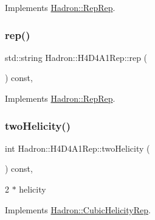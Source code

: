 Implements \mbox{\hyperlink{structHadron_1_1RepRep_ab3213025f6de249f7095892109575fde}{Hadron\+::\+Rep\+Rep}}.

\mbox{\label{structHadron_1_1H4D4A1Rep_a5b67fac5b33edc0fa72a93420b2714ca}} 
\subsubsection{\texorpdfstring{rep()}{rep()}\hspace{0.1cm}{\footnotesize\ttfamily [5/5]}}
{\footnotesize\ttfamily std\+::string Hadron\+::\+H4\+D4\+A1\+Rep\+::rep (\begin{DoxyParamCaption}{ }\end{DoxyParamCaption}) const\hspace{0.3cm}{\ttfamily [inline]}, {\ttfamily [virtual]}}



Implements \mbox{\hyperlink{structHadron_1_1RepRep_ab3213025f6de249f7095892109575fde}{Hadron\+::\+Rep\+Rep}}.

\mbox{\label{structHadron_1_1H4D4A1Rep_a67669ae49658ab0d57fd52e138c9dd40}} 
\subsubsection{\texorpdfstring{twoHelicity()}{twoHelicity()}\hspace{0.1cm}{\footnotesize\ttfamily [1/3]}}
{\footnotesize\ttfamily int Hadron\+::\+H4\+D4\+A1\+Rep\+::two\+Helicity (\begin{DoxyParamCaption}{ }\end{DoxyParamCaption}) const\hspace{0.3cm}{\ttfamily [inline]}, {\ttfamily [virtual]}}

2 $\ast$ helicity 

Implements \mbox{\hyperlink{structHadron_1_1CubicHelicityRep_af507aa56fc2747eacc8cb6c96db31ecc}{Hadron\+::\+Cubic\+Helicity\+Rep}}.

\mbox{\label{structHadron_1_1H4D4A1Rep_a67669ae49658ab0d57fd52e138c9dd40}} 
